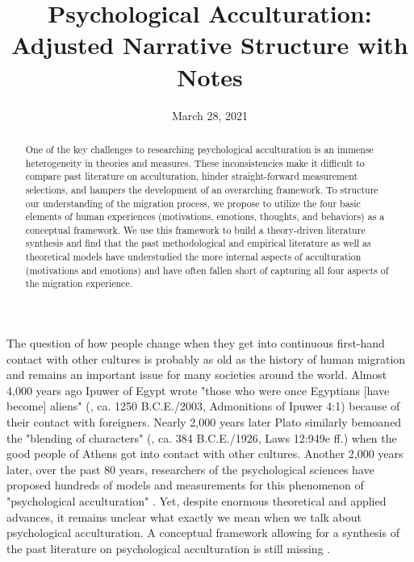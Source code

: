 \documentclass[nobib]{tufte-handout}
\title[Psychological Acculturation - Narrative]{Psychological Acculturation: \\
Adjusted Narrative Structure with Notes}
\author[Kreienkamp et al.]{}
\date{March 28, 2021}  %
\begin{document}
\maketitle %

\begin{abstract}
\noindent{}One of the key challenges to researching psychological acculturation is an immense heterogeneity in theories and measures. These inconsistencies make it difficult to compare past literature on acculturation, hinder straight-forward measurement selections, and hampers the development of an overarching framework. To structure our understanding of the migration process, we propose to utilize the four basic elements of human experiences (motivations, emotions, thoughts, and behaviors) as a conceptual framework. We use this framework to build a theory-driven literature synthesis and find that the past methodological and empirical literature as well as theoretical models have understudied the more internal aspects of acculturation (motivations and emotions) and have often fallen short of capturing all four aspects of the migration experience.
\end{abstract}


The question of how people change when they get into continuous first-hand contact with other cultures is probably as old as the history of human migration and remains an important issue for many societies around the world. 
Almost 4,000 years ago Ipuwer of Egypt wrote "those who were once Egyptians [have become] aliens" (\citeauthor{Ipuwer2003}, ca. 1250 B.C.E./2003, Admonitions of Ipuwer 4:1) because of their contact with foreigners. Nearly 2,000 years later Plato similarly bemoaned the "blending of characters" (\citeauthor{Plato1926}, ca. 384 B.C.E./1926, Laws 12:949e ff.) when the good people of Athens got into contact with other cultures. Another 2,000 years later, over the past 80 years, researchers of the psychological sciences have proposed hundreds of models and measurements for this phenomenon of "psychological acculturation" \citep[][]{Rudmin2003a}. Yet, despite enormous theoretical and applied advances, it remains unclear what exactly we mean when we talk about psychological acculturation. A conceptual framework allowing for a synthesis of the past literature on psychological acculturation is still missing \citep{Birman2014c}.
\end{document}
